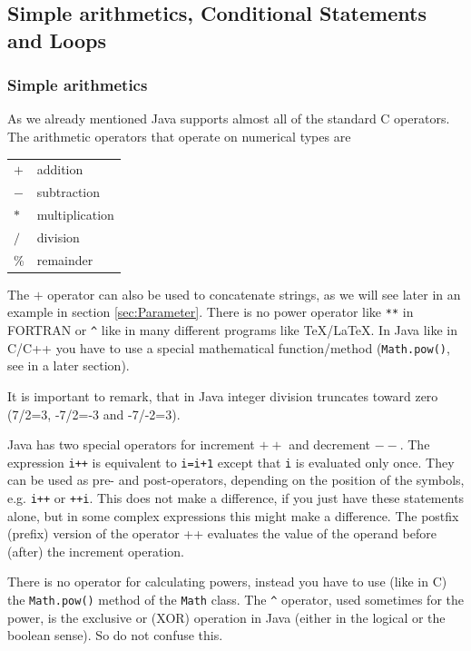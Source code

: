 \subsection{Simple arithmetics, Conditional Statements and Loops}
\label{sec:Loops}

\subsubsection{Simple arithmetics}
As we already mentioned Java  supports almost all of the standard
C operators. The arithmetic operators that operate on numerical types
are 
\begin{center}
\begin{tabular}{ll}
$+$ & addition \\
$-$ & subtraction                 \\
$*$ & multiplication \\
$/$ & division \\
\% & remainder
\end{tabular}
\end{center}
The $+$ operator can also be used to concatenate strings, as we will
see later in an example in section \ref{sec:Parameter}.
There is no power operator like \verb|**| in FORTRAN or \verb|^| like in many
different programs like TeX/LaTeX. In Java like in C/C++ you have to use
a special mathematical function/method 
(\verb|Math.pow()|, see in a later section).

It is important to remark, that in Java integer division truncates
toward zero (7/2=3, -7/2=-3 and -7/-2=3).

Java has two special operators for increment $++$ and decrement $--$. The 
expression \verb|i++| is equivalent to \verb|i=i+1| except that
\verb|i| is evaluated only once. They can be used as pre- and post-operators,
depending on the position of the symbols, e.g. \verb|i++| or \verb|++i|.
This does not make a difference, if you just have these statements
alone, but in some complex expressions this might make a difference.
The postfix (prefix) version of the operator ++ evaluates  the value
of the operand before (after) the increment operation.

There is no operator for calculating powers, instead you have to use
(like in C) the \verb|Math.pow()| method of the \verb|Math| class.
The \verb|^| operator, used sometimes for the power, is the exclusive
or (XOR) operation in Java (either in the logical or the boolean sense). 
So do not confuse this. 

